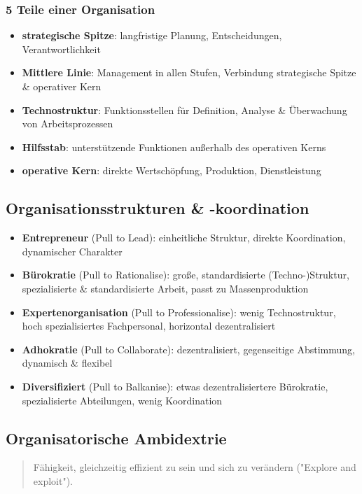 \documentclass{article}
\begin{document}
\subsubsection{5 Teile einer Organisation}

\begin{itemize}
  \item \textbf{strategische Spitze}: langfristige Planung, Entscheidungen, Verantwortlichkeit
  \item \textbf{Mittlere Linie}: Management in allen Stufen, Verbindung strategische Spitze \& operativer Kern
  \item \textbf{Technostruktur}: Funktionsstellen für Definition, Analyse \& Überwachung von Arbeitsprozessen
  \item \textbf{Hilfsstab}: unterstützende Funktionen außerhalb des operativen Kerns
  \item \textbf{operative Kern}: direkte Wertschöpfung, Produktion, Dienstleistung
\end{itemize}

\subsection{Organisationsstrukturen \& -koordination}

\begin{itemize}
  \item \textbf{Entrepreneur} (Pull to Lead): einheitliche Struktur, direkte Koordination, dynamischer Charakter
  \item \textbf{Bürokratie} (Pull to Rationalise): große, standardisierte (Techno-)Struktur, spezialisierte \& standardisierte Arbeit, passt zu Massenproduktion
  \item \textbf{Expertenorganisation} (Pull to Professionalise): wenig Technostruktur, hoch spezialisiertes Fachpersonal, horizontal dezentralisiert
  \item \textbf{Adhokratie} (Pull to Collaborate): dezentralisiert, gegenseitige Abstimmung, dynamisch \& flexibel
  \item \textbf{Diversifiziert} (Pull to Balkanise): etwas dezentralisiertere Bürokratie, spezialisierte Abteilungen, wenig Koordination
\end{itemize}



\subsection{Organisatorische Ambidextrie}
\begin{quote}Fähigkeit, gleichzeitig effizient zu sein und sich zu verändern ("Explore and exploit").\end{quote}
\end{document}
